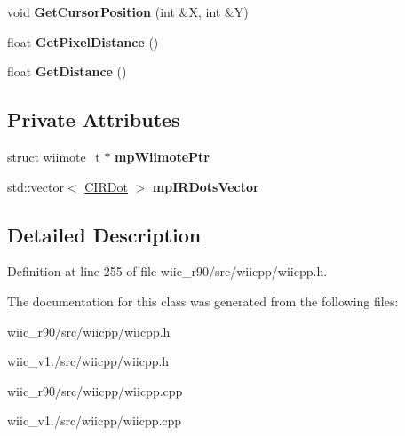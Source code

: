 \begin{DoxyCompactItemize}
\item 
\hypertarget{class_c_i_r_a8b37d7fa74319ff3736cf39956f82df0}{void {\bfseries Get\-Cursor\-Position} (int \&X, int \&Y)}\label{class_c_i_r_a8b37d7fa74319ff3736cf39956f82df0}

\item 
\hypertarget{class_c_i_r_a254b766dbc50c29d5d08ae8375e764f8}{float {\bfseries Get\-Pixel\-Distance} ()}\label{class_c_i_r_a254b766dbc50c29d5d08ae8375e764f8}

\item 
\hypertarget{class_c_i_r_aa9d59cb470867a28b558f310b154fcc2}{float {\bfseries Get\-Distance} ()}\label{class_c_i_r_aa9d59cb470867a28b558f310b154fcc2}

\end{DoxyCompactItemize}
\subsection*{Private Attributes}
\begin{DoxyCompactItemize}
\item 
\hypertarget{class_c_i_r_a6c01dcc8d2256fcc1ce5e8df9b9bf85e}{struct \hyperlink{structwiimote__t}{wiimote\-\_\-t} $\ast$ {\bfseries mp\-Wiimote\-Ptr}}\label{class_c_i_r_a6c01dcc8d2256fcc1ce5e8df9b9bf85e}

\item 
\hypertarget{class_c_i_r_a553276736583298e095fa13a2a5c0590}{std\-::vector$<$ \hyperlink{class_c_i_r_dot}{C\-I\-R\-Dot} $>$ {\bfseries mp\-I\-R\-Dots\-Vector}}\label{class_c_i_r_a553276736583298e095fa13a2a5c0590}

\end{DoxyCompactItemize}


\subsection{Detailed Description}


Definition at line 255 of file wiic\-\_\-r90/src/wiicpp/wiicpp.\-h.



The documentation for this class was generated from the following files\-:\begin{DoxyCompactItemize}
\item 
wiic\-\_\-r90/src/wiicpp/wiicpp.\-h\item 
wiic\-\_\-v1./src/wiicpp/wiicpp.\-h\item 
wiic\-\_\-r90/src/wiicpp/wiicpp.\-cpp\item 
wiic\-\_\-v1./src/wiicpp/wiicpp.\-cpp\end{DoxyCompactItemize}
